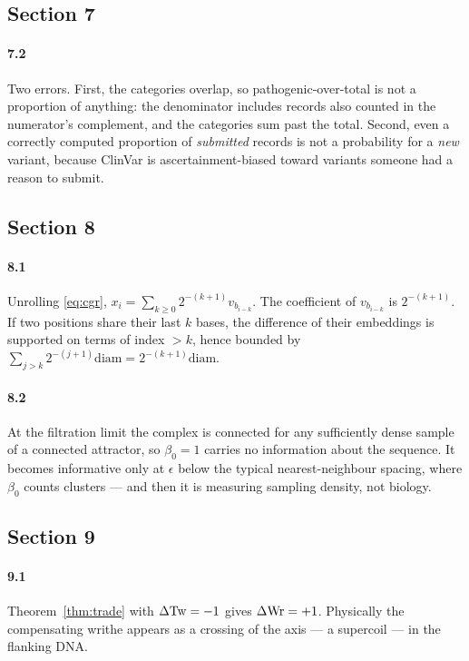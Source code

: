 \subsection*{Section 7}

\paragraph{7.2}
Two errors. First, the categories overlap, so pathogenic-over-total is not a
proportion of anything: the denominator includes records also counted in the
numerator's complement, and the categories sum past the total. Second, even a
correctly computed proportion of \emph{submitted} records is not a probability
for a \emph{new} variant, because ClinVar is ascertainment-biased toward variants
someone had a reason to submit.

\subsection*{Section 8}

\paragraph{8.1}
Unrolling \eqref{eq:cgr}, $x_i = \sum_{k\ge0} 2^{-(k+1)} v_{b_{i-k}}$. The
coefficient of $v_{b_{i-k}}$ is $2^{-(k+1)}$. If two positions share their last
$k$ bases, the difference of their embeddings is supported on terms of index
$> k$, hence bounded by $\sum_{j>k} 2^{-(j+1)}\mathrm{diam} = 2^{-(k+1)}\mathrm{diam}$.

\paragraph{8.2}
At the filtration limit the complex is connected for any sufficiently dense
sample of a connected attractor, so $\beta_0 = 1$ carries no information about
the sequence. It becomes informative only at $\epsilon$ below the typical
nearest-neighbour spacing, where $\beta_0$ counts clusters --- and then it is
measuring sampling density, not biology.

\subsection*{Section 9}

\paragraph{9.1}
Theorem~\ref{thm:trade} with $\Delta\mathrm{Tw} = -1$ gives $\Delta\mathrm{Wr} = +1$. Physically
the compensating writhe appears as a crossing of the axis --- a supercoil --- in
the flanking DNA.

